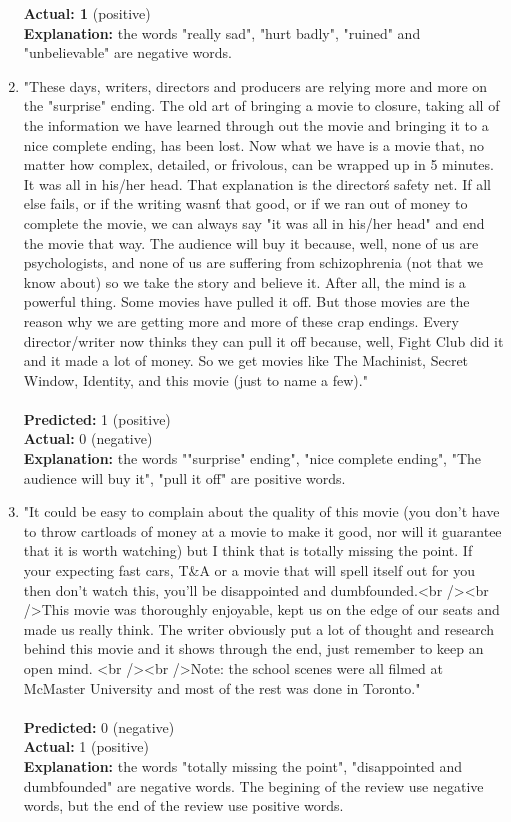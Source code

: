 \documentclass{article}
\begin{document}
\begin{enumerate}
    \textbf{Actual: 1} (positive)\\
    \textbf{Explanation:} the words "really sad", "hurt badly", "ruined" and "unbelievable" are negative words.\\
    \item "These days, writers, directors and producers are relying more and more on the "surprise" ending.
    The old art of bringing a movie to closure, taking all of the information we have learned through out the
    movie and bringing it to a nice complete ending, has been lost. Now what we have is a movie that,
    no matter how complex, detailed, or frivolous, can be wrapped up in 5 minutes. It was all in his/her head.
    That explanation is the director\'s safety net. If all else fails, or if the writing wasn\'t that good,
    or if we ran out of money to complete the movie, we can always say "it was all in his/her head" and end
    the movie that way. The audience will buy it because, well, none of us are psychologists, and none of
    us are suffering from schizophrenia (not that we know about) so we take the story and believe it.
    After all, the mind is a powerful thing. Some movies have pulled it off. But those movies are the
    reason why we are getting more and more of these crap endings. Every director/writer now thinks
    they can pull it off because, well, Fight Club did it and it made a lot of money. So we get movies like
    The Machinist, Secret Window, Identity, and this movie (just to name a few)."
    \\\\
    \textbf{Predicted:} 1 (positive)\\
    \textbf{Actual:} 0 (negative)\\
    \textbf{Explanation:} the words ""surprise" ending", "nice complete ending", "The audience will buy it", "pull it off" are positive words.
    \item "It could be easy to complain about the quality of this movie (you don't have to throw cartloads of
    money at a movie to make it good, nor will it guarantee that it is worth watching) but I think that is
    totally missing the point. If your expecting fast cars, T\&A or a movie that will spell itself out
    for you then don't watch this, you'll be disappointed and dumbfounded.<br /><br />This movie was thoroughly
    enjoyable, kept us on the edge of our seats and made us really think. The writer obviously put a lot of
    thought and research behind this movie and it shows through the end, just remember to keep an open mind.
    <br /><br />Note: the school scenes were all filmed at McMaster University and most of the rest was done
    in Toronto."\\\\
    \textbf{Predicted:} 0 (negative)\\
    \textbf{Actual:} 1 (positive)\\
    \textbf{Explanation:} the words "totally missing the point", "disappointed and dumbfounded" are negative words. The begining of the review use negative words, but the end of the review use positive words.\\


\end{enumerate}
\end{document}
